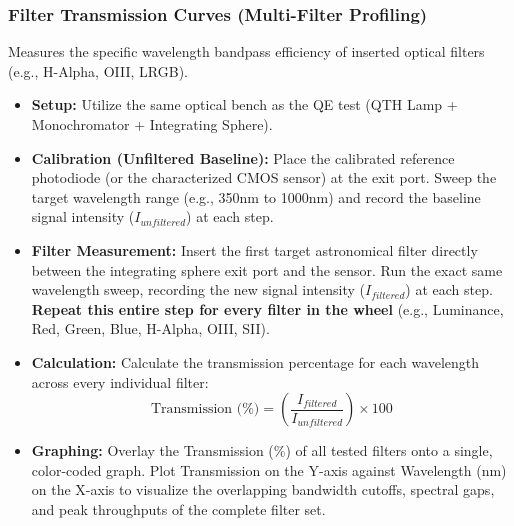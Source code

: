 \documentclass[11pt,a4paper]{article}
\begin{document}
\subsubsection{Filter Transmission Curves (Multi-Filter Profiling)}
Measures the specific wavelength bandpass efficiency of inserted optical filters (e.g., H-Alpha, OIII, LRGB).
\begin{itemize}[leftmargin=*]
    \item \textbf{Setup:} Utilize the same optical bench as the QE test (QTH Lamp + Monochromator + Integrating Sphere). 
    \item \textbf{Calibration (Unfiltered Baseline):} Place the calibrated reference photodiode (or the characterized CMOS sensor) at the exit port. Sweep the target wavelength range (e.g., 350nm to 1000nm) and record the baseline signal intensity ($I_{unfiltered}$) at each step.
    \item \textbf{Filter Measurement:} Insert the first target astronomical filter directly between the integrating sphere exit port and the sensor. Run the exact same wavelength sweep, recording the new signal intensity ($I_{filtered}$) at each step. \textbf{Repeat this entire step for every filter in the wheel} (e.g., Luminance, Red, Green, Blue, H-Alpha, OIII, SII).
    \item \textbf{Calculation:} Calculate the transmission percentage for each wavelength across every individual filter:
    $$ \text{Transmission (\%)} = \left(\frac{I_{filtered}}{I_{unfiltered}}\right) \times 100 $$
    \item \textbf{Graphing:} Overlay the Transmission (\%) of all tested filters onto a single, color-coded graph. Plot Transmission on the Y-axis against Wavelength (nm) on the X-axis to visualize the overlapping bandwidth cutoffs, spectral gaps, and peak throughputs of the complete filter set.
\end{itemize}
\end{document}
